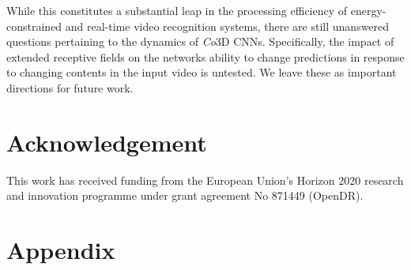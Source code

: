 \documentclass[runningheads]{llncs}
\begin{document}
While this constitutes a substantial leap in the processing efficiency of energy-constrained and real-time video recognition systems, there are still unanswered questions pertaining to the dynamics of \textit{Co}3D CNNs.
Specifically,
the impact of extended receptive fields on the networks ability to change predictions in response to changing contents in the input video is untested.
We leave these as important directions for future work.






 
\section*{Acknowledgement}
This work has received funding from the European Union’s Horizon 2020 research and innovation programme under grant agreement No 871449 (OpenDR). 
%
 
\clearpage




\clearpage
\appendix
\renewcommand{\thesection}{\Alph{section}}

\DeclareRobustCommand{\highlight}[1]{{\sethlcolor{greycol}\hl{#1}}}
\newcommand{\mathcolorbox}[2]{\colorbox{#1}{}}



\section*{Appendix}
\end{document}
